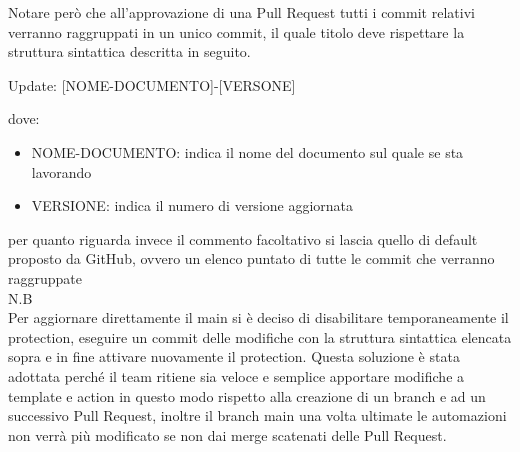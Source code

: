         
        Notare però che all'approvazione di una Pull Request tutti i commit
        relativi verranno raggruppati in un unico commit, il quale titolo deve rispettare la struttura sintattica descritta in
        seguito.
        \begin{center}
            Update: [NOME-DOCUMENTO]-[VERSONE]
        \end{center}
        dove:

        \begin{itemize}
            \item NOME-DOCUMENTO: indica il nome del documento sul quale se sta lavorando
            \item VERSIONE: indica il numero di versione aggiornata
        \end{itemize}
        per quanto riguarda invece il commento facoltativo si lascia quello di default proposto da GitHub, ovvero un elenco puntato di tutte le commit che verranno raggruppate\\
        
        N.B\\
        Per aggiornare direttamente il main si è deciso di disabilitare temporaneamente
        il protection, eseguire un commit delle modifiche con la struttura sintattica elencata sopra e in fine attivare nuovamente il protection.
        Questa soluzione è stata adottata perché il team ritiene sia veloce e semplice apportare modifiche a template e action in questo modo
        rispetto alla creazione di un branch e ad un successivo Pull Request, inoltre il branch main una volta ultimate le automazioni non verrà più modificato se non dai merge
        scatenati delle Pull Request.

